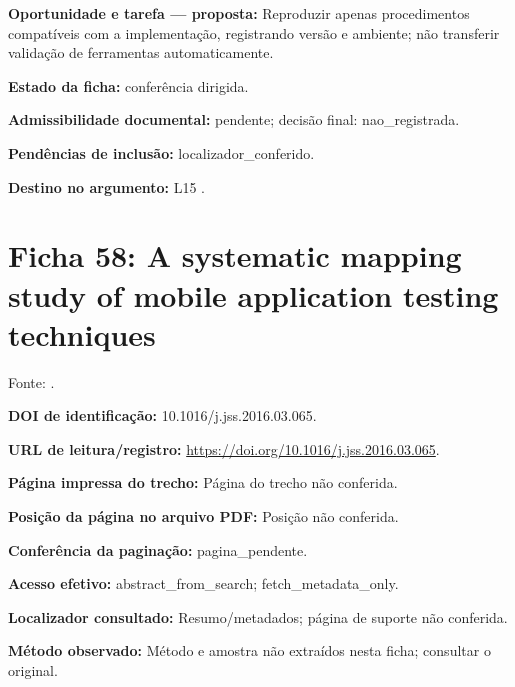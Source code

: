 \noindent\textbf{Oportunidade e tarefa — proposta:} Reproduzir apenas procedimentos compatíveis com a implementação, registrando versão e ambiente; não transferir validação de ferramentas automaticamente.\par\medskip

\noindent\textbf{Estado da ficha:} conferência dirigida.\par\medskip

\noindent\textbf{Admissibilidade documental:} pendente; decisão final: nao\_registrada.\par\medskip

\noindent\textbf{Pendências de inclusão:} localizador\_conferido.\par\medskip

\noindent\textbf{Destino no argumento:} L15 .

\clearpage\section*{Ficha 58: A systematic mapping study of mobile application testing techniques}

Fonte: \citet{eng05}.

\noindent\textbf{DOI de identificação:} 10.1016/j.jss.2016.03.065.\par\medskip

\noindent\textbf{URL de leitura/registro:} \url{https://doi.org/10.1016/j.jss.2016.03.065}.\par\medskip

\noindent\textbf{Página impressa do trecho:} Página do trecho não conferida.\par\medskip

\noindent\textbf{Posição da página no arquivo PDF:} Posição não conferida.\par\medskip

\noindent\textbf{Conferência da paginação:} pagina\_pendente.\par\medskip

\noindent\textbf{Acesso efetivo:} abstract\_from\_search; fetch\_metadata\_only.\par\medskip

\noindent\textbf{Localizador consultado:} Resumo/metadados; página de suporte não conferida.\par\medskip

\noindent\textbf{Método observado:} Método e amostra não extraídos nesta ficha; consultar o original.\par\medskip

